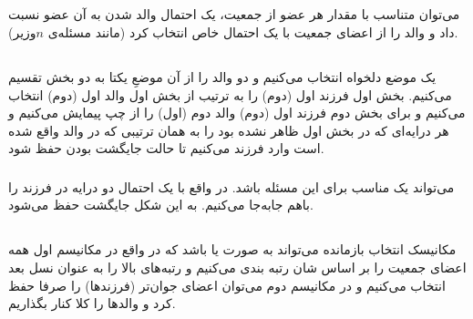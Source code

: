 \documentclass{article}
\begin{document}
\subsection{}
می‌توان متناسب با مقدار  هر عضو از جمعیت، یک احتمال والد شدن به آن عضو نسبت داد و والد را از اعضای جمعیت با یک احتمال خاص انتخاب کرد (مانند مسئله‌ی $n$وزیر).
\subsection{}
\subsubsection{}
یک موضع دلخواه انتخاب می‌کنیم و دو والد را از آن موضعِ یکتا به دو بخش تقسیم می‌کنیم. بخش اول فرزند اول (دوم) را به ترتیب از بخش اول والد اول (دوم) انتخاب می‌کنیم و برای بخش دوم فرزند اول (دوم) والد دوم (اول) را از چپ پیمایش می‌کنیم و هر درایه‌ای که در بخش اول ظاهر نشده بود را به همان ترتیبی که در والد واقع شده است وارد فرزند می‌کنیم تا حالت جایگشت بودن حفظ شود.
\subsubsection{}
 می‌تواند یک  مناسب برای این مسئله باشد. در واقع با یک احتمال دو درایه در فرزند را باهم جابه‌جا می‌کنیم. به این شکل جایگشت حفظ می‌شود.
\subsection{}
مکانیسک انتخاب بازمانده می‌تواند به صورت  یا  باشد که در واقع در مکانیسم اول همه اعضای جمعیت را بر اساس شان رتبه بندی می‌کنیم و رتبه‌های بالا را به عنوان نسل بعد انتخاب می‌کنیم و در مکانیسم دوم می‌توان اعضای جوان‌تر (فرزندها) را صرفا حفظ کرد و والدها را کلا کنار بگذاریم.

\section{}


\end{document}
